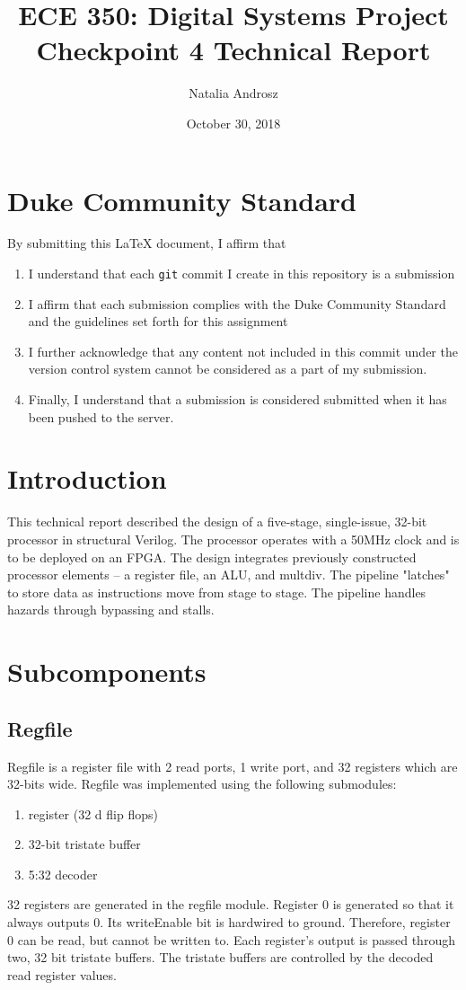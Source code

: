 \documentclass[letterpaper]{article}
\begin{document}
\title{ECE 350: Digital Systems Project Checkpoint 4 Technical Report}
\author{Natalia Androsz}
\date{October 30, 2018}
\maketitle

\section*{Duke Community Standard}

By submitting this \LaTeX{} document, I affirm that
\begin{enumerate}
    \item I understand that each \texttt{git} commit I create in this repository is a submission
    \item I affirm that each submission complies with the Duke Community Standard and the guidelines set forth for this assignment
    \item I further acknowledge that any content not included in this commit under the version control system cannot be considered as a part of my submission.
    \item Finally, I understand that a submission is considered submitted when it has been pushed to the server.
\end{enumerate}

\section{Introduction}
This technical report described the design of a five-stage, single-issue, 32-bit processor in structural Verilog. The processor operates with a 50MHz clock and is to be deployed on an FPGA. The design integrates previously constructed processor elements -- a register file, an ALU, and multdiv. The pipeline "latches" to store data as instructions move from stage to stage. The pipeline handles hazards through bypassing and stalls. 

\section{Subcomponents} 
\subsection{Regfile}
Regfile is a register file with 2 read ports, 1 write port, and 32 registers which are 32-bits wide. Regfile was implemented using the following submodules: 
\begin{enumerate}
    \item register (32 d flip flops)
    \item 32-bit tristate buffer
    \item 5:32 decoder
\end{enumerate}
32 registers are generated in the regfile module. Register 0 is generated so that it always outputs 0. Its writeEnable bit is hardwired to ground. Therefore, register 0 can be read, but cannot be written to. Each register's output is passed through two, 32 bit tristate buffers. The tristate buffers are controlled by the decoded read register values. 
\end{document}
